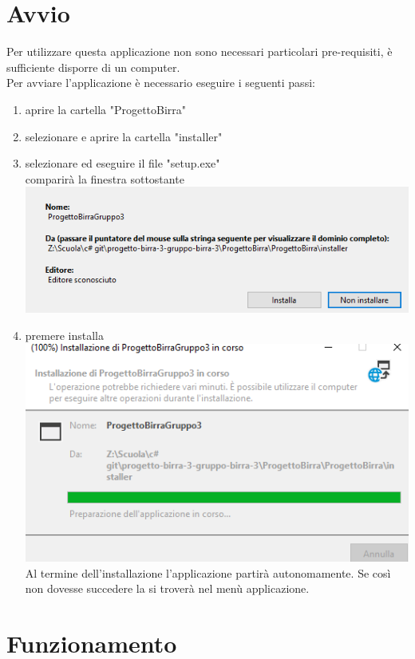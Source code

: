 \documentclass[a4paper, titlepage]{article}
\begin{document}
\section{Avvio}
Per utilizzare questa applicazione non sono necessari particolari pre-requisiti, è sufficiente disporre di un computer.\\
Per avviare l'applicazione è necessario eseguire i seguenti passi:
\begin{enumerate}
    \item aprire la cartella "ProgettoBirra"
    \item selezionare e aprire la cartella "installer"
    \item selezionare ed eseguire il file "setup.exe"\\
    comparirà la finestra sottostante\\
    \includegraphics[scale=0.30]{Immagini/imgpsh_fullsize_anim.png}
    \item premere installa\\
    \includegraphics[scale=0.30]{Immagini/imgpsh_fullsize_anim (1).png}\\
    Al termine dell'installazione l'applicazione partirà autonomamente. Se così non dovesse succedere la si troverà nel menù applicazione.
\end{enumerate}

\section{Funzionamento}
\end{document}
